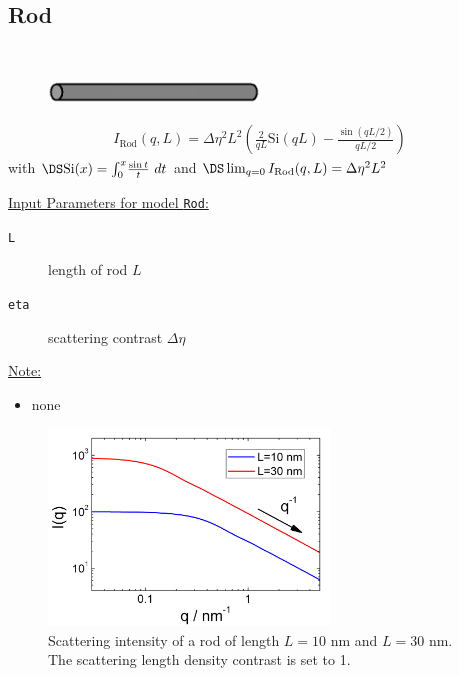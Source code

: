 
\newpage
\subsection{Rod}
\label{sect:Rod}
~\\

\begin{figure}[htb]
\begin{center}
\includegraphics[width=0.5\textwidth,height=0.05194\textwidth]{../images/form_factor/cylindrical_obj/rod.png}
\end{center}
\caption{} \label{rod}
\end{figure}
\begin{align}
I_\text{Rod}(q,L) = \Delta\eta^2L^2\left(\frac{2}{qL}\text{Si}(qL)
                                         - \frac{\sin(qL/2)}{qL/2}
                                   \right)
\end{align}
with $\DS \text{Si}(x)=\int_0^x\!\frac{\sin t}{t}\,\,dt$ and $\DS
\lim_{q=0} I_\text{Rod}(q,L) = \Delta\eta^2L^2$

\vspace{5mm}

\underline{Input Parameters for model \texttt{Rod}:}
\begin{description}
\item[\texttt{L}] length of rod $L$
\item[\texttt{eta}] scattering contrast $\Delta\eta$
\end{description}

\underline{Note:}
\begin{itemize}
\item none
\end{itemize}

\begin{figure}[htb]
\begin{center}
\includegraphics[width=0.668\textwidth,height=0.488\textwidth]{../images/form_factor/cylindrical_obj/RodIQ.png}
\end{center}
\caption{Scattering intensity of a rod of length $L=10$ nm and $L=30$ nm.
The scattering length density contrast is set to 1.}
\label{fig:I_rod}
\end{figure}

